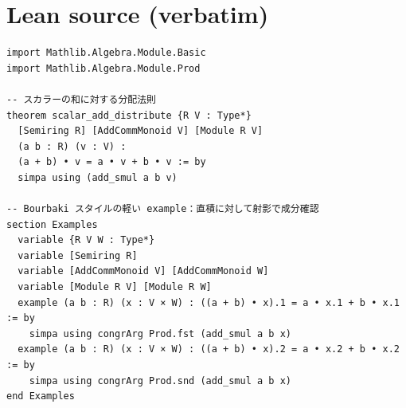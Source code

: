 \documentclass[12pt]{article}
\begin{document}
\section*{Lean source (verbatim)}
\begin{lstlisting}
import Mathlib.Algebra.Module.Basic
import Mathlib.Algebra.Module.Prod

-- スカラーの和に対する分配法則
theorem scalar_add_distribute {R V : Type*} 
  [Semiring R] [AddCommMonoid V] [Module R V]
  (a b : R) (v : V) : 
  (a + b) • v = a • v + b • v := by
  simpa using (add_smul a b v)

-- Bourbaki スタイルの軽い example：直積に対して射影で成分確認
section Examples
  variable {R V W : Type*}
  variable [Semiring R]
  variable [AddCommMonoid V] [AddCommMonoid W]
  variable [Module R V] [Module R W]
  example (a b : R) (x : V × W) : ((a + b) • x).1 = a • x.1 + b • x.1 := by
    simpa using congrArg Prod.fst (add_smul a b x)
  example (a b : R) (x : V × W) : ((a + b) • x).2 = a • x.2 + b • x.2 := by
    simpa using congrArg Prod.snd (add_smul a b x)
end Examples

\end{lstlisting}
\end{document}

